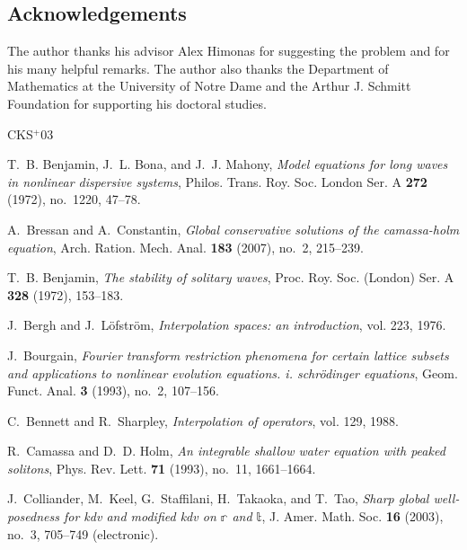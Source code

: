 \documentclass[12pt,reqno]{amsart}
\numberwithin{equation}{section}  %
\numberwithin{figure}{section}
\begin{document}
\subsection*{Acknowledgements} The author thanks his advisor Alex Himonas for
suggesting the problem and for his many helpful remarks. The author
also thanks the Department of Mathematics at the University of Notre Dame and
the Arthur J. Schmitt Foundation for supporting his doctoral studies.
%
%
\newcommand{\etalchar}[1]{$^{#1}$}
\providecommand{\bysame}{\leavevmode\hbox to3em{\hrulefill}\thinspace}
\providecommand{\MR}{\relax\ifhmode\unskip\space\fi MR }
\providecommand{\MRhref}[2]{%
  \href{http://www.ams.org/mathscinet-getitem?mr=#1}{#2}
}
\providecommand{\href}[2]{#2}
\begin{thebibliography}{CKS{\etalchar{+}}03}

T.~B. Benjamin, J.~L. Bona, and J.~J. Mahony, \emph{Model equations for long
  waves in nonlinear dispersive systems}, Philos. Trans. Roy. Soc. London Ser.
  A \textbf{272} (1972), no.~1220, 47--78.

A.~Bressan and A.~Constantin, \emph{Global conservative solutions of the
  camassa-holm equation}, Arch. Ration. Mech. Anal. \textbf{183} (2007), no.~2,
  215--239.

T.~B. Benjamin, \emph{The stability of solitary waves}, Proc. Roy. Soc.
  (London) Ser. A \textbf{328} (1972), 153--183.

J.~Bergh and J.~L{\"o}fstr{\"o}m, \emph{Interpolation spaces: an introduction},
  vol. 223, 1976.

J.~Bourgain, \emph{Fourier transform restriction phenomena for certain lattice
  subsets and applications to nonlinear evolution equations. i. schr{\"o}dinger
  equations}, Geom. Funct. Anal. \textbf{3} (1993), no.~2, 107--156.

C.~Bennett and R.~Sharpley, \emph{Interpolation of operators}, vol. 129, 1988.

R.~Camassa and D.~D. Holm, \emph{An integrable shallow water equation with
  peaked solitons}, Phys. Rev. Lett. \textbf{71} (1993), no.~11, 1661--1664.

\bibitem[CKS{\etalchar{+}}03]{Colliander:2003kx}
J.~Colliander, M.~Keel, G.~Staffilani, H.~Takaoka, and T.~Tao, \emph{Sharp
  global well-posedness for kdv and modified kdv on $\mathbb r$ and $\mathbb t$}, J. Amer. Math. Soc. \textbf{16} (2003), no.~3, 705--749 (electronic).


\end{thebibliography}
\end{document}
